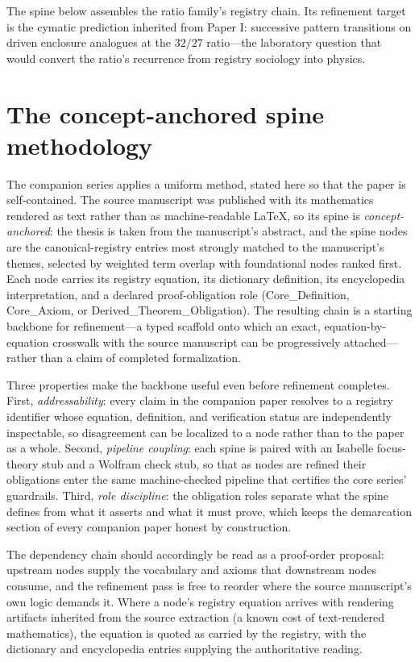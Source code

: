 \documentclass[11pt]{article}
\theoremstyle{remark}
\begin{document}
The spine below assembles the ratio family's registry chain. Its refinement target is the cymatic prediction inherited from Paper I: successive pattern transitions on driven enclosure analogues at the $32/27$ ratio---the laboratory question that would convert the ratio's recurrence from registry sociology into physics.

\section{The concept-anchored spine methodology}
\label{sec:method}

The companion series applies a uniform method, stated here so that the paper is self-contained. The source manuscript was published with its mathematics rendered as text rather than as machine-readable LaTeX, so its spine is \emph{concept-anchored}: the thesis is taken from the manuscript's abstract, and the spine nodes are the canonical-registry entries most strongly matched to the manuscript's themes, selected by weighted term overlap with foundational nodes ranked first. Each node carries its registry equation, its dictionary definition, its encyclopedia interpretation, and a declared proof-obligation role (Core\_Definition, Core\_Axiom, or Derived\_Theorem\_Obligation). The resulting chain is a starting backbone for refinement---a typed scaffold onto which an exact, equation-by-equation crosswalk with the source manuscript can be progressively attached---rather than a claim of completed formalization.

Three properties make the backbone useful even before refinement completes. First, \emph{addressability}: every claim in the companion paper resolves to a registry identifier whose equation, definition, and verification status are independently inspectable, so disagreement can be localized to a node rather than to the paper as a whole. Second, \emph{pipeline coupling}: each spine is paired with an Isabelle focus-theory stub and a Wolfram check stub, so that as nodes are refined their obligations enter the same machine-checked pipeline that certifies the core series' guardrails. Third, \emph{role discipline}: the obligation roles separate what the spine defines from what it asserts and what it must prove, which keeps the demarcation section of every companion paper honest by construction.

The dependency chain should accordingly be read as a proof-order proposal: upstream nodes supply the vocabulary and axioms that downstream nodes consume, and the refinement pass is free to reorder where the source manuscript's own logic demands it. Where a node's registry equation arrives with rendering artifacts inherited from the source extraction (a known cost of text-rendered mathematics), the equation is quoted as carried by the registry, with the dictionary and encyclopedia entries supplying the authoritative reading.
\end{document}

